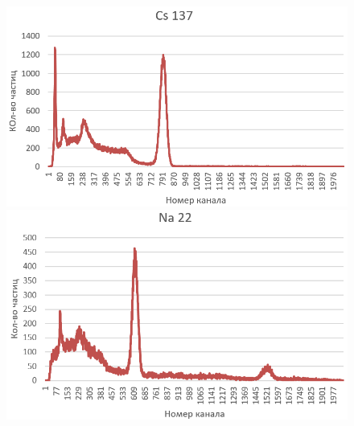 \documentclass[a4paper, 12pt]{article}%
\begin{document}
\begin{enumerate}
\begin{figure}[h!]
	\begin{minipage}[h]{0.47\linewidth}
		\centering
		\includegraphics[scale=0.28]{Cs}
	\end{minipage}
	\hfill
	\begin{minipage}[h]{0.47\linewidth}
		\centering
		\includegraphics[scale=0.31]{Na}
	\end{minipage}
\end{figure}


\end{enumerate}
\end{document}
